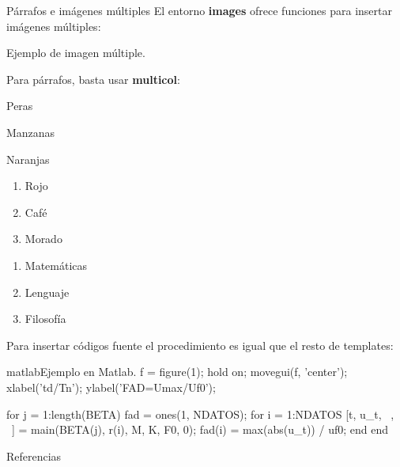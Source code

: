 \separatorcolumn


\begin{block}{Párrafos e imágenes múltiples}
	El entorno \textbf{images} ofrece funciones para insertar imágenes múltiples:
	
	\begin{images}{Ejemplo de imagen múltiple.}
	\end{images}

	Para párrafos, basta usar \textbf{multicol}:
	
	\begin{multicols}{2}
		\lipsum[1]
		
		\begin{enumeratebf}[label=\alph*) ] %
			\item Peras
			\item Manzanas
			\item Naranjas
		\end{enumeratebf}
		
		\begin{enumerate}[label=\roman*) ]
			\item Rojo
			\item Café
			\item Morado
		\end{enumerate}
		
		\begin{enumerate}[label=\greek*) ]
			\item Matemáticas
			\item Lenguaje
			\item Filosofía
		\end{enumerate}
	\end{multicols}

	Para insertar códigos fuente el procedimiento es igual que el resto de templates:

\begin{sourcecode}{matlab}{Ejemplo en Matlab.}
f = figure(1); hold on; movegui(f, 'center');
xlabel('td/Tn'); ylabel('FAD=Umax/Uf0');

for j = 1:length(BETA)
	fad = ones(1, NDATOS); %
	for i = 1:NDATOS
		[t, u_t, ~, ~] = main(BETA(j), r(i), M, K, F0, 0);
		fad(i) = max(abs(u_t)) / uf0;
	end
end
\end{sourcecode}

	\lipsum[11]
\end{block}

\begin{block}{Referencias}
	
\end{block}